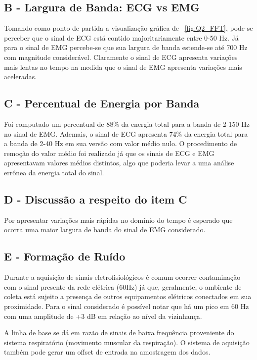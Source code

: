 \documentclass{article}
\begin{document}
\begin{multicols}{2}
\subsection*{B - Largura de Banda: ECG vs EMG}
Tomando como ponto de partida a visualização gráfica de ~\ref{fig:Q2_FFT}, pode-se perceber que o sinal de ECG está contido majoritariamente entre 0-50 Hz. Já para o sinal de EMG percebe-se que sua largura de banda estende-se até 700 Hz com magnitude considerável. Claramente o sinal de ECG apresenta variações mais lentas no tempo na medida que o sinal de EMG apresenta variações mais aceleradas.
\subsection*{C - Percentual de Energia por Banda}
Foi computado um percentual de 88\% da energia total para a banda de 2-150 Hz no sinal de EMG. Ademais, o sinal de ECG apresenta 74\% da energia total para a banda de 2-40 Hz em sua versão com valor médio nulo. O procedimento de remoção do valor médio foi realizado já que os sinais de ECG e EMG apresentavam valores médios distintos, algo que poderia levar a uma análise errônea da energia total do sinal.
\subsection*{D - Discussão a respeito do item C}
Por apresentar variações mais rápidas no domínio do tempo é esperado que ocorra uma maior largura de banda do sinal de EMG considerado.
\subsection*{E - Formação de Ruído}
Durante a aquisição de sinais eletrofisiológicos é comum ocorrer contaminação com o sinal presente da rede elétrica (60Hz) já que, geralmente, o ambiente de coleta está sujeito a presença de outros equipamentos elétricos conectados em sua proximidade. Para o sinal considerado é possível notar que há um pico em 60 Hz com uma amplitude de +3 dB em relação ao nível da vizinhança.

A linha de base se dá em razão de sinais de baixa frequência proveniente do sistema respiratório (movimento muscular da respiração). O sistema de aquisição também pode gerar um offset de entrada na amostragem dos dados.
\end{multicols}
\end{document}
